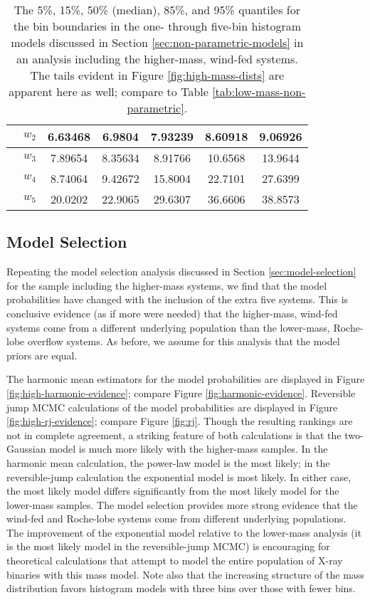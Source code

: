 \documentclass[preprint]{aastex}
\begin{document}
\begin{table}
\begin{center}
\begin{tabular}{|c|c|c|c|c|c|c|}
      \hline
      & $w_2$ & 6.63468 & 6.9804 & 7.93239 & 8.60918 & 9.06926 \\
      \hline
      & $w_3$ & 7.89654 & 8.35634 & 8.91766 & 10.6568 & 13.9644 \\
      \hline
      & $w_4$ & 8.74064 & 9.42672 & 15.8004 & 22.7101 & 27.6399 \\
      \hline
      & $w_5$ & 20.0202 & 22.9065 & 29.6307 & 36.6606 & 38.8573 \\
      \hline
    \end{tabular}
  \end{center}
  \caption{\label{tab:high-mass-non-parametric} The 5\%, 15\%, 50\%
    (median), 85\%, and 95\% quantiles for the bin boundaries in the
    one- through five-bin histogram models discussed in Section
    \ref{sec:non-parametric-models} in an analysis including the higher-mass, wind-fed systems.  The tails evident in Figure \ref{fig:high-mass-dists} are apparent here as well; compare to Table \ref{tab:low-mass-non-parametric}.}
\end{table}

\subsection{Model Selection}

Repeating the model selection analysis discussed in Section
\ref{sec:model-selection} for the sample including the higher-mass
systems, we find that the model probabilities have changed with the
inclusion of the extra five systems.  This is conclusive evidence (as
if more were needed) that the higher-mass, wind-fed systems come from
a different underlying population than the lower-mass, Roche-lobe
overflow systems.  As before, we assume for this analysis that the
model priors are equal.

The harmonic mean estimators for the model probabilities are displayed
in Figure \ref{fig:high-harmonic-evidence}; compare Figure
\ref{fig:harmonic-evidence}.  Reversible jump MCMC calculations of the
model probabilities are displayed in Figure
\ref{fig:high-rj-evidence}; compare Figure \ref{fig:rj}.  Though the
resulting rankings are not in complete agreement, a striking feature
of both calculations is that the two-Gaussian model is much more
likely with the higher-mass samples.  In the harmonic mean
calculation, the power-law model is the most likely; in the
reversible-jump calculation the exponential model is most likely.  In
either case, the most likely model differs significantly from the most
likely model for the lower-mass samples.  The model selection provides
more strong evidence that the wind-fed and Roche-lobe systems come
from different underlying populations.  The improvement of the
exponential model relative to the lower-mass analysis (it is the most
likely model in the reversible-jump MCMC) is encouraging for
theoretical calculations that attempt to model the entire population
of X-ray binaries with this mass model.  Note also that the increasing
structure of the mass distribution favors histogram models with three
bins over those with fewer bins.
\end{document}
